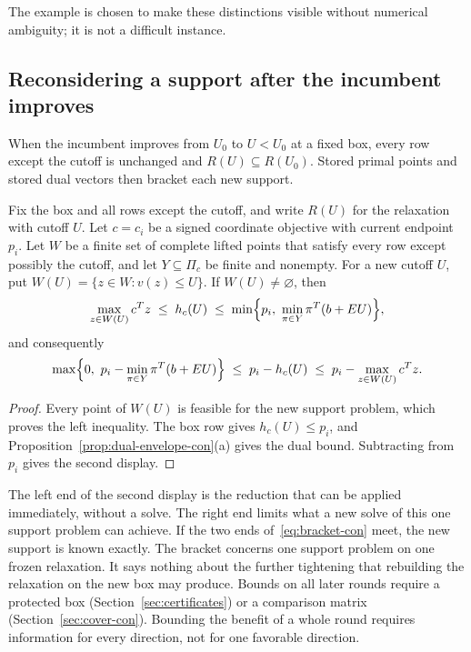 The example is chosen to make these distinctions visible without numerical
ambiguity; it is not a difficult instance.

\subsection{Reconsidering a support after the incumbent improves}\label{sec:brackets-con}

When the incumbent improves from $U_0$ to $U<U_0$ at a fixed box, every
row except the cutoff is unchanged and $R(U)\subseteq R(U_0)$. Stored
primal points and stored dual vectors then bracket each new support.

\begin{proposition}\label{prop:bracket-con}
Fix the box and all rows except the cutoff, and write $R(U)$ for the
relaxation with cutoff $U$. Let $c=c_i$ be a signed coordinate objective
with current endpoint $p_i$. Let $W$ be a finite set of complete lifted
points that satisfy every row except possibly the cutoff, and let
$Y\subseteq\Pi_c$ be finite and nonempty. For a new cutoff $U$, put
$W(U)=\{z\in W:v(z)\le U\}$. If $W(U)\ne\varnothing$, then
\begin{equation}\label{eq:bracket-con}
 \max_{z\in W(U)}c^Tz\;\le\;h_c(U)\;\le\;
 \min\Bigl\{p_i,\ \min_{\pi\in Y}\pi^T(b+EU)\Bigr\},
\end{equation}
and consequently
\[
 \max\Bigl\{0,\ p_i-\min_{\pi\in Y}\pi^T(b+EU)\Bigr\}
 \;\le\;p_i-h_c(U)\;\le\;p_i-\max_{z\in W(U)}c^Tz .
\]
\end{proposition}

\begin{proof}
Every point of $W(U)$ is feasible for the new support problem, which
proves the left inequality. The box row gives $h_c(U)\le p_i$, and
Proposition~\ref{prop:dual-envelope-con}(a) gives the dual bound.
Subtracting from $p_i$ gives the second display.
\end{proof}

The left end of the second display is the reduction that can be applied
immediately, without a solve. The right end limits what a new solve of
this one support problem can achieve. If the two ends
of~\eqref{eq:bracket-con} meet, the new support is known exactly. The
bracket concerns one support problem on one frozen relaxation. It says
nothing about the further tightening that rebuilding the relaxation on the
new box may produce. Bounds on all later rounds require a protected box
(Section~\ref{sec:certificates}) or a comparison matrix
(Section~\ref{sec:cover-con}). Bounding the benefit of a whole round
requires information for every direction, not for one favorable direction.

